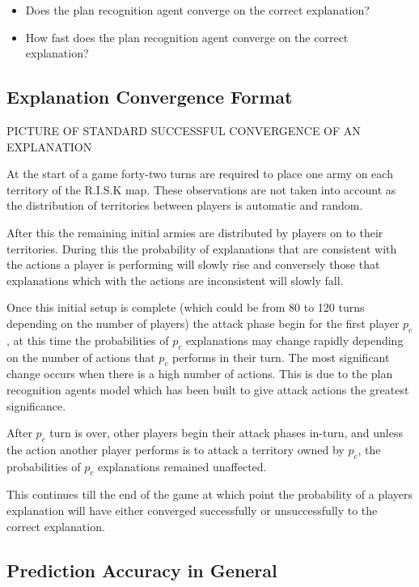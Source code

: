 \documentclass[parskip]{cs4rep}
\begin{document}
\begin{itemize}
\item
Does the plan recognition agent converge on the correct explanation?
\item
How fast does the plan recognition agent converge on the correct explanation?
\end{itemize}

\subsection{Explanation Convergence Format}

PICTURE OF STANDARD SUCCESSFUL CONVERGENCE OF AN EXPLANATION

At the start of a game forty-two turns are required to place one army on each territory of the R.I.S.K map. These observations are not taken into account as the distribution of territories between players is automatic and random. 

After this the remaining initial armies are distributed by players on to their territories. During this the probability of explanations that are consistent with the actions a player is performing will slowly rise and conversely those that explanations which with the actions are inconsistent will slowly fall.

Once this initial setup is complete (which could be from 80 to 120 turns depending on the number of players) the attack phase begin for the first player $p_c$, at this time the probabilities of $p_c$ explanations may change rapidly depending on the number of actions that $p_c$ performs in their turn. The most significant change occurs when there is a high number of actions. This is due to the plan recognition agents model which has been built to give attack actions the greatest significance.

After $p_c$ turn is over, other players begin their attack phases in-turn, and unless the action another player performs is to attack a territory owned by $p_c$, the probabilities of $p_c$ explanations remained unaffected. 

This continues till the end of the game at which point the probability of a players explanation will have either converged successfully or unsuccessfully to the correct explanation. 

\subsection{Prediction Accuracy in General}
\end{document}
